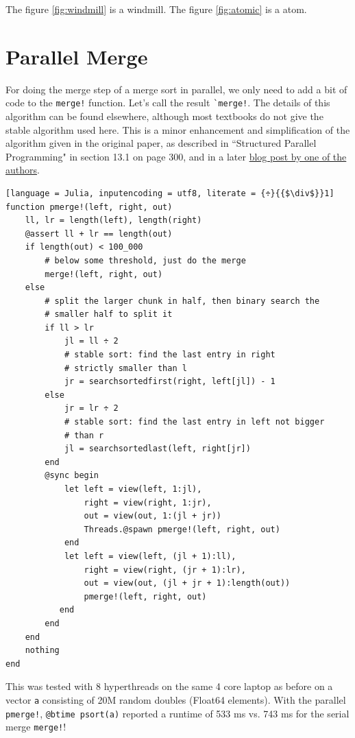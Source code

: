 \documentclass{juliacon}
\begin{document}
The figure \ref{fig:windmill} is a windmill.
The figure \ref{fig:atomic} is a atom.



\appendix
\section{Parallel Merge}
\label{subsub:pmerge}

For doing the merge step of a merge sort in parallel, we only need to add a bit of code to the \verb|merge!| function. Let's call the result \verb|`merge!|. The details of this algorithm can be found elsewhere, although most textbooks do not give the stable algorithm used here. This is a minor enhancement and simplification of the algorithm given in the original paper\cite{Gavril:1975:MPP:361020.361216}, as described in ``Structured Parallel Programming"\cite{McCool:2012:SPP:2385466} in section 13.1 on page 300, and in a later \href{https://software.intel.com/en-us/articles/a-parallel-stable-sort-using-c11-for-tbb-cilk-plus-and-openmp}{blog post by one of the authors}\cite{parallel-merge-intel}.

\begin{lstlisting}[language = Julia, inputencoding = utf8, literate = {÷}{{$\div$}}1]
function pmerge!(left, right, out)
    ll, lr = length(left), length(right)
    @assert ll + lr == length(out)
    if length(out) < 100_000
        # below some threshold, just do the merge
        merge!(left, right, out)
    else
        # split the larger chunk in half, then binary search the
        # smaller half to split it
        if ll > lr
            jl = ll ÷ 2
            # stable sort: find the last entry in right
            # strictly smaller than l
            jr = searchsortedfirst(right, left[jl]) - 1
        else
            jr = lr ÷ 2
            # stable sort: find the last entry in left not bigger
            # than r
            jl = searchsortedlast(left, right[jr])
        end
        @sync begin
            let left = view(left, 1:jl),
                right = view(right, 1:jr),
                out = view(out, 1:(jl + jr))
                Threads.@spawn pmerge!(left, right, out)
            end
            let left = view(left, (jl + 1):ll),
                right = view(right, (jr + 1):lr),
                out = view(out, (jl + jr + 1):length(out))
                pmerge!(left, right, out)
           end
        end
    end
    nothing
end
\end{lstlisting}

This was tested with 8 hyperthreads on the same 4 core laptop as before on a vector \verb|a| consisting of 20M random doubles (Float64 elements). With the parallel \verb|pmerge!|, \verb|@btime psort(a)| reported a runtime of 533 ms vs. 743 ms for the serial merge \verb|merge!|!
\end{document}
